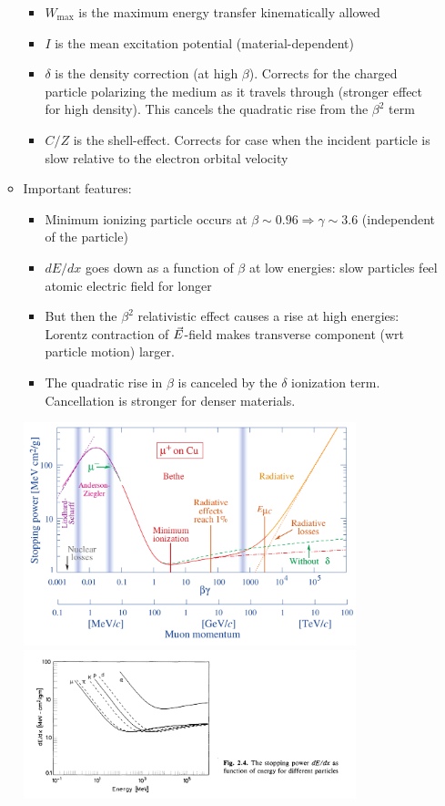 \begin{itemize}
\begin{itemize}
\begin{itemize}
      \item $W_\text{max}$ is the maximum energy transfer kinematically allowed
      \item $I$ is the mean excitation potential (material-dependent)
      \item $\delta$ is the density correction (at high $\beta$). Corrects for the charged particle polarizing the medium as it travels through (stronger effect for high density). This cancels the quadratic rise from the $\beta^2$ term
      \item $C/Z$ is the shell-effect. Corrects for case when the incident particle is slow relative to the electron orbital velocity
    \end{itemize}
    \item Important features:
    \begin{itemize}
      \item Minimum ionizing particle occurs at $\beta \sim 0.96 \Rightarrow \gamma \sim 3.6$ (independent of the particle)
      \item $dE/dx$ goes down as a function of $\beta$ at low energies: slow particles feel atomic electric field for longer
      \item But then the $\beta^2$ relativistic effect causes a rise at high energies: Lorentz contraction of $\vec{E}$-field makes transverse component (wrt particle motion) larger. 
      \item The quadratic rise in $\beta$ is canceled by the $\delta$ ionization term. Cancellation is stronger for denser materials.
    \end{itemize}
    \begin{center}
      \includegraphics[width=0.8\textwidth]{figs/dEdx_bbPDG.png}
      \includegraphics[width=0.8\textwidth]{figs/dEdx_bethebloch.png}

\end{center}
\end{itemize}
\end{itemize}
